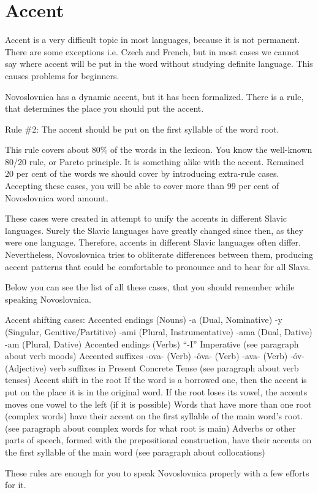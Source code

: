 \section{Accent}

Accent is a very difficult topic in most languages, because it is not permanent. There are some exceptions i.e. Czech and French, but in most cases we cannot say where accent will be put in the word without studying definite language. This causes problems for beginners.

Novoslovnica has a dynamic accent, but it has been formalized. There is a rule, that determines the place you should put the accent. 

Rule \#2: The accent should be put on the first syllable of the word root.

This rule covers about 80\% of the words in the lexicon. You know the well-known 80/20 rule, or Pareto principle. It is something alike with the accent. Remained 20 per cent of the words we should cover by introducing extra-rule cases. Accepting these cases, you will be able to cover more than 99 per cent of Novoslovnica word amount.

These cases were created in attempt to unify the accents in different Slavic languages. Surely the Slavic languages have greatly changed since then, as they were one language. Therefore, accents in different Slavic languages often differ. Nevertheless, Novoslovnica tries to obliterate differences between them, producing accent patterns that could be comfortable to pronounce and to hear for all Slavs.

Below you can see the list of all these cases, that you should remember while speaking Novoslovnica.

Accent shifting cases:
Accented endings (Nouns)
-a (Dual, Nominative)
-y (Singular, Genitive/Partitive)
-ami (Plural, Instrumentative)
-ama (Dual, Dative)
-am (Plural, Dative)
Accented endings (Verbs)
“-I” Imperative (see paragraph about verb moods)
Accented suffixes
-ova- (Verb)
-ôva- (Verb)
-ava- (Verb)
-óv- (Adjective)
verb suffixes in Present Concrete Tense (see paragraph about verb tenses)
Accent shift in the root
If the word is a borrowed one, then the accent is put on the place it is in the original word.
If the root loses its vowel, the accents moves one vowel to the left (if it is possible)
Words that have more than one root (complex words) have their accent on the first syllable of the main word’s root. (see paragraph about complex words for what root is main) 
Adverbs or other parts of speech, formed with the prepositional construction, have their accents on the first syllable of the main word (see paragraph about collocations)

These rules are enough for you to speak Novoslovnica properly with a few efforts for it. 
